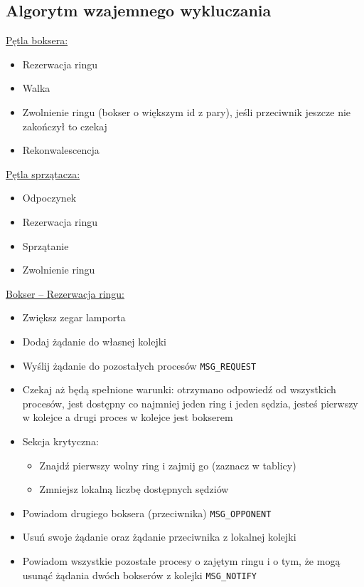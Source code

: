 \documentclass{article}
\begin{document}
\subsection{Algorytm wzajemnego wykluczania}

\underline{Pętla boksera:}
\begin{itemize}
    \item Rezerwacja ringu
    \item Walka
    \item Zwolnienie ringu (bokser o większym id z pary), jeśli
    przeciwnik jeszcze nie zakończył to czekaj
    \item Rekonwalescencja
\end{itemize}

\underline{Pętla sprzątacza:}
\begin{itemize}
    \item Odpoczynek
    \item Rezerwacja ringu
    \item Sprzątanie
    \item Zwolnienie ringu
\end{itemize}

\underline{Bokser -- Rezerwacja ringu:}
\begin{itemize}
    \item Zwiększ zegar lamporta
    \item Dodaj żądanie do własnej kolejki
    \item Wyślij żądanie do pozostałych procesów \verb|MSG_REQUEST|
    \item Czekaj aż będą spełnione warunki: otrzymano odpowiedź od
    wszystkich procesów, jest dostępny co najmniej jeden ring i jeden
    sędzia, jesteś pierwszy w kolejce a drugi proces w kolejce jest
    bokserem
    \item Sekcja krytyczna:
    \begin{itemize}
        \item Znajdź pierwszy wolny ring i zajmij go (zaznacz w tablicy)
        \item Zmniejsz lokalną liczbę dostępnych sędziów
    \end{itemize}
    \item Powiadom drugiego boksera (przeciwnika) \verb|MSG_OPPONENT|
    \item Usuń swoje żądanie oraz żądanie przeciwnika z lokalnej kolejki
    \item Powiadom wszystkie pozostałe procesy o zajętym ringu i o tym,
    że mogą usunąć żądania dwóch bokserów z kolejki \verb|MSG_NOTIFY|
\end{itemize}
\end{document}
